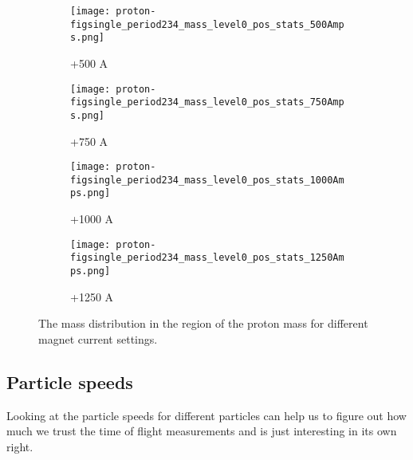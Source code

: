 \begin{figure}[h]
             \begin{subfigure}[b]{0.24\textwidth}
            \centering
            \texttt{[image: proton-figsingle\_period234\_mass\_level0\_pos\_stats\_500Amps.png]}
            \caption{+500 A}
            \label{fig_mproton500}
            \end{subfigure}
             \hfill   
            \begin{subfigure}[b]{0.24\textwidth}
            \centering
            \texttt{[image: proton-figsingle\_period234\_mass\_level0\_pos\_stats\_750Amps.png]}
            \caption{+750 A}
            \label{fig_mproton750}
            \end{subfigure}
             \hfill   
            \begin{subfigure}[b]{0.24\textwidth}
            \centering
            \texttt{[image: proton-figsingle\_period234\_mass\_level0\_pos\_stats\_1000Amps.png]}
            \caption{+1000 A}
            \label{fig_mproton1000}
            \end{subfigure}
             \hfill                             
             \begin{subfigure}[b]{0.24\textwidth}
            \centering
            \texttt{[image: proton-figsingle\_period234\_mass\_level0\_pos\_stats\_1250Amps.png]}
            \caption{+1250 A}
            \label{fig_mproton+1250}
            \end{subfigure}

            
\caption{The mass distribution in the region of the proton mass for different magnet current settings.}
\label{fig_protonmass}
  \end{figure}
  
  \newpage
  
  \subsection{Particle speeds}
  
  Looking at the particle speeds for different particles can help us to figure out how much we trust the time of flight measurements and is just interesting in its own right.
  
